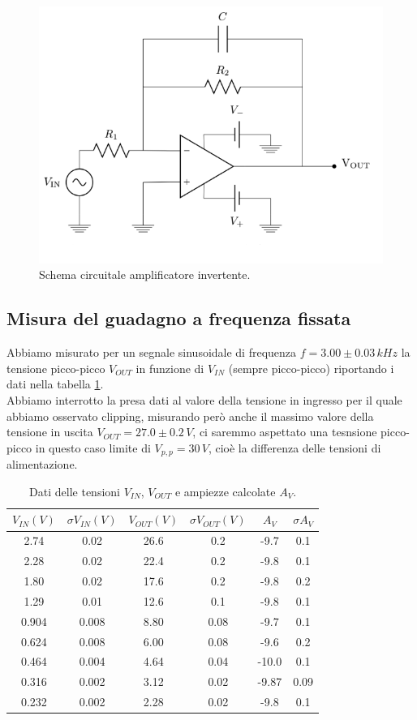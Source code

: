 \documentclass[10pt,a4paper]{article}
\begin{document}
\begin{figure}[!htb]
  \centering
  \includegraphics[scale=0.5]{opampinvert.png}
\caption{Schema circuitale amplificatore invertente.}
\label{opampinvert}
\end{figure}

\subsection{Misura del guadagno a frequenza fissata}
Abbiamo misurato per un segnale sinusoidale di frequenza $f=3.00 \pm 0.03 \, kHz$ la tensione picco-picco $V_{OUT}$ in funzione di $V_{IN}$ (sempre picco-picco) riportando i dati nella tabella \ref{tabellaGuadagno}. \\
Abbiamo interrotto la presa dati al valore della tensione in ingresso per il quale abbiamo osservato clipping, misurando però anche il massimo valore della tensione in uscita  $V_{OUT} = 27.0\pm0.2 \, V$, ci saremmo aspettato una tesnsione picco-picco in questo caso limite di $V_{p,p} = 30 \, V$, cioè la differenza delle tensioni di alimentazione.

\begin{table}[!htb]\centering
\begin{tabular}{|c|c|c|c|c|c|}
\hline
$V_{IN} (V)$ & $ \sigma V_{IN} (V)$ & $ V_{OUT} (V)$ & $ \sigma V_{OUT} (V)$ & $A_V$ & $\sigma A_V$\\  
\hline
2.74 & 0.02 & 26.6 & 0.2 & -9.7 & 0.1\\
2.28 & 0.02 & 22.4 & 0.2 & -9.8 & 0.1\\
1.80 & 0.02 & 17.6 & 0.2 & -9.8 & 0.2\\
1.29 & 0.01 & 12.6 & 0.1 & -9.8 & 0.1\\
0.904 & 0.008 & 8.80 & 0.08 & -9.7 & 0.1\\
0.624 & 0.008 & 6.00 & 0.08 & -9.6 & 0.2\\
0.464 & 0.004 & 4.64 & 0.04 & -10.0 & 0.1\\
0.316 & 0.002 & 3.12 & 0.02 & -9.87 & 0.09\\
0.232 & 0.002 & 2.28 & 0.02 & -9.8 & 0.1\\
\hline
\end{tabular}
\caption{Dati delle tensioni $V_{IN}$, $V_{OUT}$ e ampiezze calcolate $A_V$.}
\label{tabellaGuadagno}
\end{table}
\end{document}
